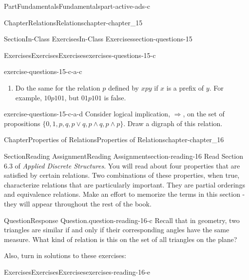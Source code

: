 \documentclass[oneside,10pt,]{book}
\numberwithin{equation}{section}
\begin{document}
\begin{partptx}{Part}{Fundamentals}{}{Fundamentals}{}{}{part-active-ads-c}
\begin{chapterptx}{Chapter}{Relations}{}{Relations}{}{}{chapter-chapter_15}
\begin{sectionptx}{Section}{In-Class Exercises}{}{In-Class Exercises}{}{}{section-questions-15}
\begin{exercises-subsection-numberless}{Exercises}{Exercises}{}{Exercises}{}{}{exercises-questions-15-c}
\begin{exercisegroup}
\begin{divisionexerciseeg}{3}{}{}{exercise-questions-15-c-a-c}
\begin{enumerate}[label=(\alph*)]
\item{}Do the same for the relation \(p\) defined by \(x p y\) if \(x\) is a prefix of \(y\). For example, \(10 p 101\), but \(01 p 101\) is false.%
\end{enumerate}
%
\end{divisionexerciseeg}%
\begin{divisionexerciseeg}{4}{}{}{exercise-questions-15-c-a-d}%
Consider logical implication, \(\Rightarrow\), on the set of propositions \(\{0,1,p,q,p\lor q, p\land q, p\land p \}\). Draw a digraph of this relation.%
\end{divisionexerciseeg}%
\end{exercisegroup}
\par\medskip\noindent
\end{exercises-subsection-numberless}
\end{sectionptx}
\end{chapterptx}
%
\typeout{************************************************}
\typeout{************************************************}
%
\begin{chapterptx}{Chapter}{Properties of Relations}{}{Properties of Relations}{}{}{chapter-chapter_16}
\renewcommand*{\chaptername}{Chapter}
\index{}%
%
%
\typeout{************************************************}
\typeout{************************************************}
%
\begin{sectionptx}{Section}{Reading Assignment}{}{Reading Assignment}{}{}{section-reading-16}
Read Section 6.3 of \emph{Applied Discrete Structures}.  You will read about four properties that are satisfied by certain relations.  Two combinations of these properties, when true, characterize relations that are particularly important.  They are partial orderings and equivalence relations. Make an effort to memorize the terms in this section - they will appear throughout the rest of the book.%
\begin{question}{Question}{Response Question.}{question-reading-16-c}%
Recall that in geometry, two triangles are similar if and only if their corresponding angles have the same measure. What kind of relation is this on the set of all triangles on the plane?%
\end{question}
Also, turn in solutions to these exercises:%
%
%
\typeout{************************************************}
\typeout{************************************************}
%
\begin{exercises-subsection-numberless}{Exercises}{Exercises}{}{Exercises}{}{}{exercises-reading-16-e}

\end{exercises-subsection-numberless}
\end{sectionptx}
\end{chapterptx}
\end{partptx}
\end{document}
